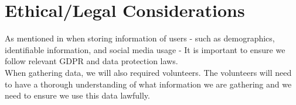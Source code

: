 \documentclass[a4paper,fleqn,10pt]{article}
\begin{document}
\section{Ethical/Legal Considerations}
As mentioned in  when storing information of users - such as demographics, identifiable information, and social media usage -
It is important to ensure we follow relevant GDPR and data protection laws.\\
When gathering data, we will also required volunteers. The volunteers will need to have a thorough understanding of what
information we are gathering and we need to ensure we use this data lawfully.

\newpage


\end{document}
